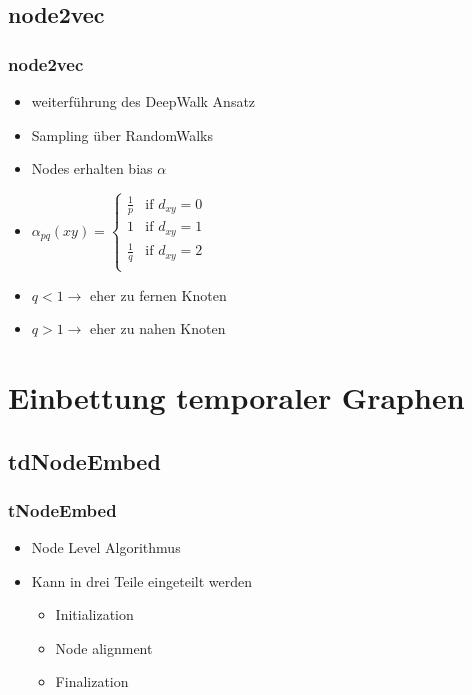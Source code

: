 \documentclass{beamer}
\begin{document}
\subsection{node2vec}
\begin{frame}
  \frametitle{node2vec}
  \begin{itemize}
    \item weiterführung des DeepWalk Ansatz
    \item Sampling über RandomWalks
    \item Nodes erhalten bias \(\alpha\)
    \item  \(\alpha_{pq}(xy) = \begin{cases} \frac{1}{p} & \text{if } d_{xy} = 0 \\ 1 & \text{if } d_{xy} = 1 \\\frac{1}{q} & \text{if } d_{xy} = 2 \\\end{cases}\)
    \item  \(q < 1 \rightarrow\) eher zu fernen Knoten
    \item  \(q > 1 \rightarrow\) eher zu nahen Knoten
  \end{itemize}
\end{frame}

\section{Einbettung temporaler Graphen}
\subsection{tdNodeEmbed}
\begin{frame}
  \frametitle{tNodeEmbed}
  \begin{itemize}
    \item Node Level Algorithmus
    \item Kann in drei Teile eingeteilt werden
    \begin{itemize}
      \item Initialization
      \item Node alignment
      \item Finalization
    \end{itemize}
  \end{itemize}
\end{frame}
\end{document}
